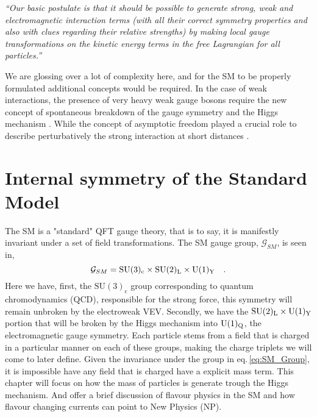 \textit{“Our basic postulate is that it should be possible to generate strong,  weak and electromagnetic  interaction terms (with all their correct symmetry properties and also with clues regarding their relative strengths) by making local gauge transformations on the kinetic energy terms in the free Lagrangian for all particles.”}

We are glossing over a lot of complexity here, and for the SM to be properly formulated additional concepts would be required. In the case of weak interactions, the presence of very heavy weak gauge bosons require the new concept of spontaneous breakdown of the gauge symmetry and the Higgs mechanism \cite{higgs1964broken,englert1964broken,guralnik1964global} . 
%
While the concept of asymptotic freedom played a crucial role to describe perturbatively the strong interaction at short distances \cite{politzer1973reliable,gross1973ultraviolet}.  

\renewcommand{\cleardoublepage}{}
\renewcommand{\clearpage}{}

\section{Internal symmetry of the Standard Model}
%
The SM is a "standard" QFT gauge theory, that is to say, it is manifestly invariant under a set of field transformations. The SM gauge group, $\mathcal{G}_{SM}$, is seen in, 
%
\begin{equation}
\mathcal{G}_{SM} = \mathrm{SU}(3)_{\mathrm{c}} \times \mathrm{SU}(2)_{\mathrm{L}} \times \mathrm{U}(1)_{\mathrm{Y}} \quad  .
\label{eq:SM_Group}
\end{equation} 
%
Here we have, first, the $\mathrm{SU}(3)_{\mathrm{c}}$ group corresponding to quantum chromodynamics (QCD), responsible for the strong force, this symmetry will remain unbroken by the electroweak VEV. Secondly, we have the $\mathrm{SU}(2)_{\mathrm{L}} \times \mathrm{U}(1)_{\mathrm{Y}}$ portion that will be broken by the Higgs mechanism into $\mathrm{U}(1)_{\mathrm{Q}}$, the electromagnetic gauge symmetry.
%
Each particle stems from a field that is charged in a particular manner on each of these groups, making the charge triplets we will come to later define. 
%
Given the invariance under the group in eq.\,\ref{eq:SM_Group}, it is impossible have any field that is charged have a explicit mass term. This chapter will focus on how the mass of particles is generate trough the Higgs mechanism. And offer a brief discussion of flavour physics in the SM and how flavour changing currents can point to {\color{blue} New Physics (NP)}. 



